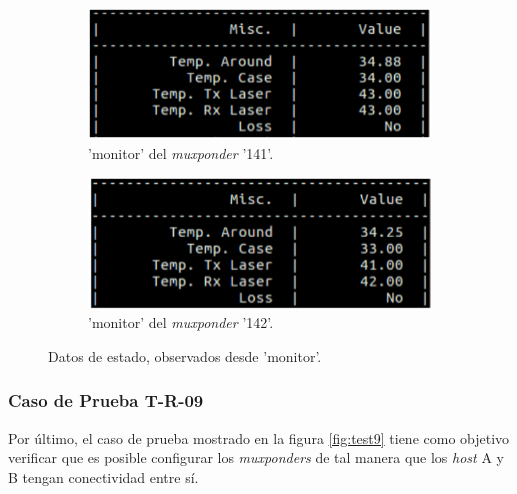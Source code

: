       \begin{figure}[H]
        \centering
        \begin{subfigure}[b]{0.45\textwidth}
            \centering
            \includegraphics[width=\textwidth]{Figures/test8_2_mux1.png}
            \caption{'monitor' del \textit{muxponder} '141'.}
        \end{subfigure}
        \quad
        \begin{subfigure}[b]{0.45\textwidth}  
            \centering 
            \includegraphics[width=\textwidth]{Figures/test8_2_mux2.png}
            \caption{'monitor' del \textit{muxponder} '142'.}
        \end{subfigure}
        \caption{Datos de estado, observados desde 'monitor'.}
        \label{fig:test8_2}
    \end{figure}

      \subsubsection{Caso de Prueba T-R-09}

      Por último, el caso de prueba mostrado en la figura \ref{fig:test9} tiene como objetivo verificar que es posible configurar los \textit{muxponders} de tal manera que los \textit{host} A y B tengan conectividad entre sí. 

